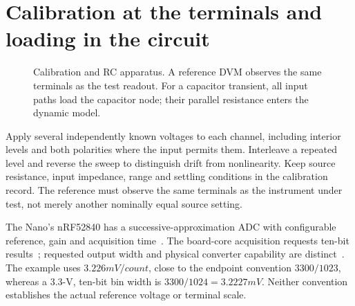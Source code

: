 \section{Calibration at the terminals and loading in the circuit}
\begin{figure}[t]
\centering
{}
\caption{Calibration and RC apparatus. A reference DVM observes the same terminals as the test readout. For a capacitor transient, all input paths load the capacitor node; their parallel resistance enters the dynamic model.}
\label{fig:analog-inputs-apparatus}
\end{figure}

Apply several independently known voltages to each channel, including interior levels and both polarities where the input permits them. Interleave a repeated level and reverse the sweep to distinguish drift from nonlinearity. Keep source resistance, input impedance, range and settling conditions in the calibration record. The reference must observe the same terminals as the instrument under test, not merely another nominally equal source setting.

The Nano's nRF52840 has a successive-approximation ADC with configurable reference, gain and acquisition time~\cite{nrf52840}. The board-core acquisition requests ten-bit results~\cite{arduinocore}; requested output width and physical converter capability are distinct~\cite{analogread}. The example uses $3.226\unit{mV/count}$, close to the endpoint convention $3300/1023$, whereas a 3.3-V, ten-bit bin width is $3300/1024=3.2227\unit{mV}$. Neither convention establishes the actual reference voltage or terminal scale.

